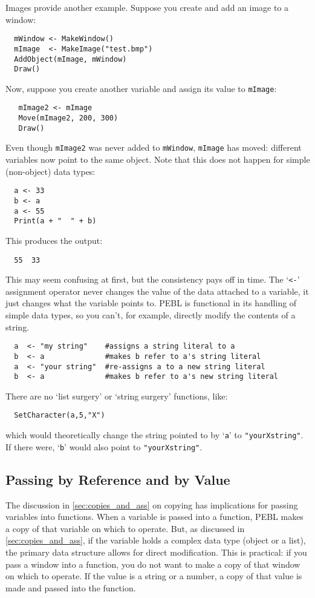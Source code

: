 Images provide another example. Suppose you create and add an image to a window:
\begin{verbatim}
  mWindow <- MakeWindow()
  mImage  <- MakeImage("test.bmp")
  AddObject(mImage, mWindow)
  Draw()
\end{verbatim}
Now, suppose you create another variable and assign its
value to \texttt{mImage}:
\begin{verbatim}
   mImage2 <- mImage
   Move(mImage2, 200, 300)
   Draw()
\end{verbatim}
Even though \texttt{mImage2} was never added to \texttt{mWindow}, \texttt{mImage}
has moved: different variables now point to the same object. Note that this does not happen for simple (non-object) data types:
\begin{verbatim}
  a <- 33
  b <- a
  a <- 55
  Print(a + "  " + b)
\end{verbatim}
This produces the output:
\begin{verbatim}
  55  33
\end{verbatim} 
This may seem confusing at first, but the consistency pays off in
time.  The `\verb+<-+' assignment operator never changes the value of
the data attached to a variable, it just changes what the variable
points to.  PEBL is functional in its handling of simple data types,
so you can't, for example, directly modify the contents of a string.
\begin{verbatim}
  a  <- "my string"    #assigns a string literal to a
  b  <- a              #makes b refer to a's string literal
  a  <- "your string"  #re-assigns a to a new string literal
  b  <- a              #makes b refer to a's new string literal
\end{verbatim}
There are no `list surgery' or `string surgery' functions, like: 
\begin{verbatim}
  SetCharacter(a,5,"X")
\end{verbatim}
which would theoretically change the string pointed to by `\texttt{a}' to 
\texttt{"yourXstring"}.  If there were, `\texttt{b}' would also point to \texttt{"yourXstring"}.


\subsection{Passing by Reference and by Value}

The discussion in \ref{sec:copies_and_ass} on copying has implications for passing
variables into functions.  When a variable is passed into a function, PEBL makes a copy of that variable on which to operate. But, as discussed in \ref{sec:copies_and_ass}, if the variable holds a complex data
type (object or a list), the primary data structure allows for direct modification.  This is practical: if you pass a
window into a function, you do not want to make a copy of
that window on which to operate.  If the value is a string or a
number, a copy of that value is made and passed into the function.
  
